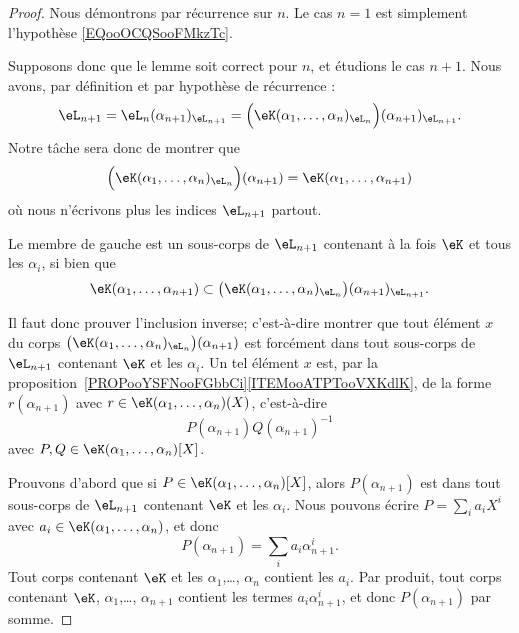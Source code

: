\begin{proof}
    Nous démontrons par récurrence sur \( n\). Le cas \( n=1\) est simplement l'hypothèse \eqref{EQooOCQSooFMkzTc}. 
    
    Supposons donc que le lemme soit correct pour \( n\), et étudions le cas \( n+1\). Nous avons, par définition et par hypothèse de récurrence :
    \begin{equation}
        \eL_{n+1}=\eL_n(\alpha_{n+1})_{\eL_{n+1}}=\Big( \eK(\alpha_1,\ldots, \alpha_n)_{\eL_n} \Big)(\alpha_{n+1})_{\eL_{n+1}}.
    \end{equation}
    Notre tâche sera donc de montrer que
    \begin{equation}\label{EQooIHMGooTlPcsd}
        \Big( \eK(\alpha_1,\ldots, \alpha_n)_{\eL_n} \Big)(\alpha_{n+1})=\eK(\alpha_1,\ldots,\alpha_{n+1})
    \end{equation}
    où nous n'écrivons plus les indices \( \eL_{n+1}\) partout.

    Le membre de gauche est un sous-corps de \( \eL_{n+1}\) contenant à la fois \( \eK \) et tous les \(\alpha_i \), si bien que
    \begin{equation}\label{EQooLLRHooHOjLfk}
        \eK(\alpha_1,\ldots,\alpha_{n+1})\subset \big( \eK(\alpha_1,\ldots, \alpha_n)_{\eL_n} \big)(\alpha_{n+1})_{\eL_{n+1}}.
    \end{equation}

    Il faut donc prouver l'inclusion inverse; c'est-à-dire montrer que tout élément \( x \) du corps \( \big( \eK(\alpha_1,\ldots, \alpha_n)_{\eL_n} \big)(\alpha_{n+1})\) est forcément dans tout sous-corps de \( \eL_{n+1}\) contenant \( \eK\) et les \( \alpha_i\). Un tel élément \( x \) est, par la proposition~\ref{PROPooYSFNooFGbbCi}\ref{ITEMooATPTooVXKdlK}, de la forme \( r(\alpha_{n+1})\) avec \( r\in \eK(\alpha_1,\ldots, \alpha_{n})(X)\), c'est-à-dire
            \begin{equation}
                P(\alpha_{n+1})Q(\alpha_{n+1})^{-1}
            \end{equation}
            avec \( P,Q\in \eK(\alpha_1,\ldots, \alpha_n)[X]\).

            Prouvons d'abord que si \( P\in \eK(\alpha_1,\ldots, \alpha_n)[X]\), alors \( P(\alpha_{n+1})\) est dans tout sous-corps de \( \eL_{n+1}\) contenant \( \eK\) et les \( \alpha_i\). Nous pouvons écrire \( P=\sum_ia_iX^i\) avec \( a_i\in \eK(\alpha_1,\ldots, \alpha_n)\), et donc
            \begin{equation}
                P(\alpha_{n+1})=\sum_ia_i\alpha_{n+1}^i.
            \end{equation}
            Tout corps contenant \( \eK\) et les \( \alpha_1\),\ldots, \( \alpha_n\) contient les \( a_i\). Par produit, tout corps contenant \( \eK\), \( \alpha_1\),\ldots,  \( \alpha_{n+1}\) contient les termes \( a_i\alpha_{n+1}^i\), et donc \( P(\alpha_{n+1})\) par somme.


\end{proof}
